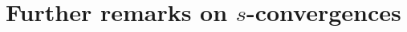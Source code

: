 \documentclass[numbers=enddot,12pt,final,onecolumn,notitlepage]{scrartcl}%
\theoremstyle{definition}
\newenvironment{proof}[1][Proof]{\noindent\textbf{#1.} }{\ \rule{0.5em}{0.5em}}
\theoremstyle{plainsl}
\begin{document}
\begin{comment}
So, let us first suppose $v \in Q$. Then $v$ cannot $B$-reach $t$. Since $B \in \Gamma_{k}(s,t)$, this means that $v$ can $B$-reach $s$. Suppose towards contradiction that $v \notin Q'$. Then on the  path in $B$ from $v$ to $s$, there must exist some vertex $w \in P$, for otherwise the entire path is contained in $Q$ and thus remains a path in $\Phi_{P,Q}(B)$. But if $w \in P$, then $v$ can $B$-reach $t$, a contradiction. Hence, $v \in Q'$, so $Q \subseteq Q'$.

On the other hand, suppose $v \in P$. Then $v$ can $B$-reach $t$. Suppose towards contradiction that $v \in Q'$, i.e. that $v$ can $B'$-reach $s$. Firstly, if $v$ could $B$-reach $s$, then on the path from $v$ to $s$, there would be an arc in $A(P,Q)$. But said arc would not be in $\Phi_{P,Q}(B)$, meaning $v$ would not $B'$-reach $s$, a contradiction. On the other hand, if $v$ could not $B$-reach $s$, then there would be some arc in $A(Q,P)$ on the $B'$-path from $v$ to $s$. But since $v \in P$ and $s \in Q$, this would yield that there exists an arc in $B' \cap A(P,Q)$, a contradiction since $B' \cap A(P,Q) = \emptyset$. Hence, we see that $v \notin Q' \implies v \in P'$.
Thus, $P \subseteq P' \implies V \setminus P' =Q' \subseteq Q = V \setminus P$. \textcolor{red}{[I don't think the $P \subseteq P'$ argument above actually works, but maybe it'll give us an idea on how to prove it...]}

All together, we see that $Q = Q' \implies P = P'$. And so, $(g \circ f)(B) = B$, proving the claim. \end{proof}

\begin{proof}
[Proof of Claim 4.]TODO.
\end{proof}

Claim 3 and Claim 4 show that the maps $\Phi_{P,Q}$ and $\Psi_{P^{\prime
},Q^{\prime}}$ are mutually inverse. Hence, $\Phi_{P,Q}$ is a bijection. Thus,
the bijection principle yields%
\[
\left\vert \Gamma_{k}\left(  s,t\right)  \setminus\Gamma_{k}\left(  t\right)
\right\vert =\left\vert \Gamma_{k}\left(  s,t\right)  \setminus\Gamma
_{k}\left(  s\right)  \right\vert .
\]
As we explained above, this leads to $\gamma_{k}\left(  s\right)  =\gamma
_{k}\left(  t\right)  $, and thus Theorem \ref{thm.balgamma} is proved.
\end{comment}

\section{Further remarks on $s$-convergences}
\end{document}
